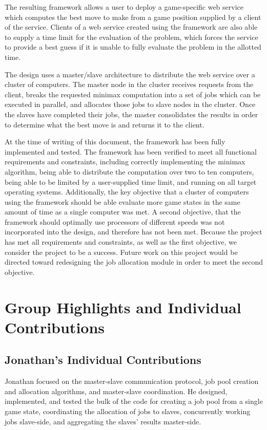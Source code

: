 \documentclass[pdftex,12pt,a4paper]{article}
\begin{document}
The resulting framework allows a user to deploy a game-specific web service which computes the best move to make from a game position supplied by a client of the service. Clients of a web service created using the framework are also able to supply a time limit for the evaluation of the problem, which forces the service to provide a best guess if it is unable to fully evaluate the problem in the allotted time.

The design uses a master/slave architecture to distribute the web service over a cluster of computers. The master node in the cluster receives requests from the client, breaks the requested minimax computation into a set of jobs which can be executed in parallel, and allocates those jobs to slave nodes in the cluster. Once the slaves have completed their jobs, the master consolidates the results in order to determine what the best move is and returns it to the client.

At the time of writing of this document, the framework has been fully implemented and tested. The framework has been verified to meet all functional requirements and constraints, including correctly implementing the minimax algorithm, being able to distribute the computation over two to ten computers, being able to be limited by a user-supplied time limit, and running on all target operating systems. Additionally, the key objective that a cluster of computers using the framework should be able evaluate more game states in the same amount of time as a single computer was met. A second objective, that the framework should optimally use processors of different speeds was not incorporated into the design, and therefore has not been met. Because the project has met all requirements and constraints, as well as the first objective, we consider the project to be a success. Future work on this project would be directed toward redesigning the job allocation module in order to meet the second objective.

%
%
\pagebreak
\section{Group Highlights and Individual Contributions}

\subsection{Jonathan's Individual Contributions}

Jonathan focused on the master-slave communication protocol, job pool creation and allocation algorithms, and master-slave coordination. He designed, implemented, and tested the bulk of the code for creating a job pool from a single game state, coordinating the allocation of jobs to slaves, concurrently working jobs slave-side, and aggregating the slaves' results master-side.
\end{document}
